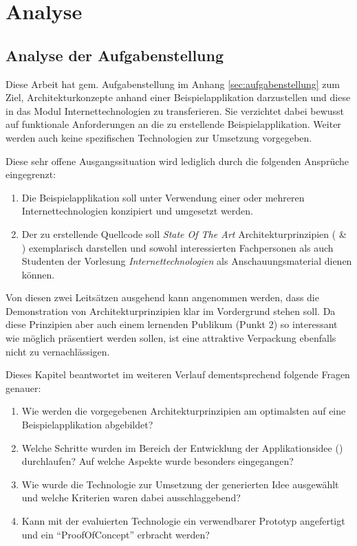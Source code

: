 \chapter{Analyse}
\label{sec:analyse}

\section{Analyse der Aufgabenstellung}
\label{sec:analyse-der-aufgabenstellung}

Diese Arbeit hat gem. Aufgabenstellung im Anhang \ref{sec:aufgabenstellung} zum Ziel, Architekturkonzepte anhand einer Beispielapplikation darzustellen und diese in das Modul Internettechnologien zu transferieren. Sie verzichtet dabei bewusst auf funktionale Anforderungen an die zu erstellende Beispielapplikation. Weiter werden auch keine spezifischen Technologien zur Umsetzung vorgegeben.

Diese sehr offene Ausgangssituation wird lediglich durch die folgenden Ansprüche eingegrenzt:

\begin{enumerate}
	\item Die Beispielapplikation soll unter Verwendung einer oder mehreren Internettechnologien konzipiert und umgesetzt werden.
	\item Der zu erstellende Quellcode soll \emph{State Of The Art} Architekturprinzipien (\cite{ROCA} \& \cite{TilkovSlides}) exemplarisch darstellen und sowohl interessierten Fachpersonen als auch Studenten der Vorlesung \emph{Internettechnologien} als Anschauungsmaterial dienen können.
\end{enumerate}

Von diesen zwei Leitsätzen ausgehend kann angenommen werden, dass die Demonstration von Architekturprinzipien klar im Vordergrund stehen soll. Da diese Prinzipien aber auch einem lernenden Publikum (Punkt 2) so interessant wie möglich präsentiert werden sollen, ist eine attraktive Verpackung ebenfalls nicht zu vernachlässigen.

Dieses Kapitel beantwortet im weiteren Verlauf dementsprechend folgende Fragen genauer:

\begin{enumerate}
	\item Wie werden die vorgegebenen Architekturprinzipien am optimalsten auf eine Beispielapplikation abgebildet?
	\item Welche Schritte wurden im Bereich der Entwicklung der Applikationsidee () durchlaufen? Auf welche Aspekte wurde besonders eingegangen?
	\item Wie wurde die Technologie zur Umsetzung der generierten Idee ausgewählt und welche Kriterien waren dabei ausschlaggebend?
	\item Kann mit der evaluierten Technologie ein verwendbarer Prototyp angefertigt und ein ``\gls{ProofOfConcept}'' erbracht werden?
\end{enumerate}

\newpage


\newpage


\newpage


\newpage

